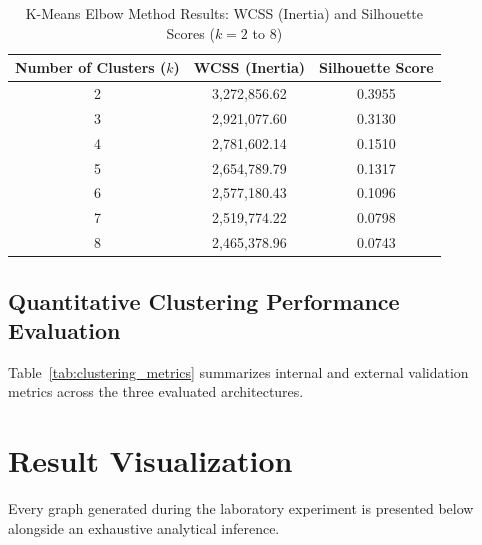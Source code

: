 \documentclass[12pt,a4paper]{article}
\begin{document}
\begin{table}[H]
\centering
\caption{K-Means Elbow Method Results: WCSS (Inertia) and Silhouette Scores ($k = 2$ to $8$)}
\label{tab:kmeans_elbow}
\begin{tabular}{ccc}
\toprule
\textbf{Number of Clusters ($k$)} & \textbf{WCSS (Inertia)} & \textbf{Silhouette Score} \\
\midrule
2 & 3,272,856.62 & 0.3955 \\
3 & 2,921,077.60 & 0.3130 \\
4 & 2,781,602.14 & 0.1510 \\
5 & 2,654,789.79 & 0.1317 \\
6 & 2,577,180.43 & 0.1096 \\
7 & 2,519,774.22 & 0.0798 \\
8 & 2,465,378.96 & 0.0743 \\
\bottomrule
\end{tabular}
\end{table}

\subsection{Quantitative Clustering Performance Evaluation}
Table~\ref{tab:clustering_metrics} summarizes internal and external validation metrics across the three evaluated architectures.

\begin{table}[H]
\centering
\caption{Comprehensive Quantitative Clustering Evaluation Across Algorithms}
\label{tab:clustering_metrics}
\end{table}

\section{Result Visualization}
Every graph generated during the laboratory experiment is presented below alongside an exhaustive analytical inference.
\end{document}
